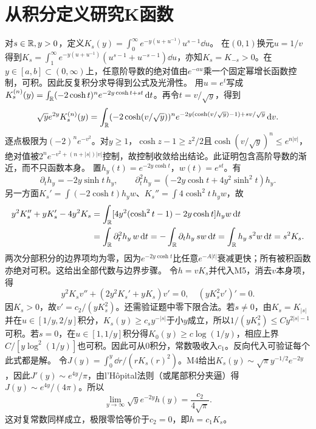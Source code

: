 \documentclass[UTF8,fontset=fandol,11pt]{ctexart}
\begin{document}
\section{从积分定义研究K函数}
对$s\in\mathbb R,y>0$，定义$K_s(y)=\int_0^\infty e^{-y(u+u^{-1})}u^{s-1}\dd u$。
在$(0,1)$换元$u=1/v$得到$K_s=\int_1^\infty e^{-y(u+u^{-1})}(u^{s-1}+u^{-s-1})\dd u$，亦知$K_s=K_{-s}>0$。在$y\in[a,b]\subset(0,\infty)$上，任意阶导数的绝对值由$e^{-au}$乘一个固定幂增长函数控制，可积。因此反复积分求导得到公式及光滑性。
用$u=e^t$写成$K_s^{(n)}(y)=\int_\mathbb R(-2\cosh t)^ne^{-2y\cosh t+st}\,\mathrm d t$。再令$t=v/\sqrt y$，得到
\[\sqrt y e^{2y}K_s^{(n)}(y)=\int_\mathbb R(-2\cosh(v/\sqrt y))^n e^{-2y(\cosh(v/\sqrt y)-1)+sv/\sqrt y}\,\mathrm d v.\]
逐点极限为$(-2)^ne^{-v^2}$。对$y\ge1$，$\cosh z-1\ge z^2/2$且$\cosh(v/\sqrt y)^n\le e^{n|v|}$，绝对值被$2^ne^{-v^2+(n+|s|)|v|}$控制，故控制收敛给出结论。此证明包含高阶导数的渐近，而不只函数本身。
置$h_y(t)=e^{-2y\cosh t}$，$w(t)=e^{st}$。有
\[\partial_th_y=-2y\sinh t\,h_y,\qquad\partial_t^2h_y=(-2y\cosh t+4y^2\sinh^2t)h_y.\]
另一方面$K_s'=\int(-2\cosh t)h_yw$、$K_s''=\int4\cosh^2t\,h_yw$，故
\begin{align*}
y^2K_s''+yK_s'-4y^2K_s
&=\int_\mathbb R[4y^2(\cosh^2t-1)-2y\cosh t]h_yw\,\mathrm d t\\
&=\int_\mathbb R\partial_t^2h_y\,w\,\mathrm d t
=-\int_\mathbb R\partial_th_y\,s w\,\mathrm d t
=\int_\mathbb R h_y\,s^2w\,\mathrm d t=s^2K_s.
\end{align*}
两次分部积分的边界项均为零，因为$e^{-2y\cosh t}$比任意$e^{-A|t|}$衰减更快；所有被积函数亦绝对可积。这给出全部代数与边界步骤。
令$h=vK_s$并代入M5，消去$v$本身项，得
\[y^2K_sv''+(2y^2K_s'+yK_s)v'=0,\quad (yK_s^2v')'=0.\]
因$K_s>0$，故$v'=c_2/(yK_s^2)$。还需验证题中零下限合法。若$s\ne0$，由$K_s=K_{|s|}$并在$u\in[1/y,2/y]$积分，$K_s(y)\ge c_s y^{-|s|}$于小$y$成立，所以$1/(yK_s^2)\le C y^{2|s|-1}$可积。若$s=0$，在$u\in[1,1/y]$积分得$K_0(y)\ge c\log(1/y)$，相应上界$C/[y\log^2(1/y)]$也可积。因此可从$0$积分，常数吸收入$c_1$。反向代入可验证每个此式都是解。
令$J(y)=\int_0^y\dd r/(rK_s(r)^2)$。M4给出$K_s(y)\sim\sqrt\pi y^{-1/2}e^{-2y}$，因此$J'(y)\sim e^{4y}/\pi$，由l'Hôpital法则（或尾部积分夹逼）得$J(y)\sim e^{4y}/(4\pi)$。所以
\[\lim_{y\to\infty}\sqrt y e^{-2y}h(y)=\frac{c_2}{4\sqrt\pi}.\]
这对复常数同样成立，极限零恰等价于$c_2=0$，即$h=c_1K_s$。
\end{document}
